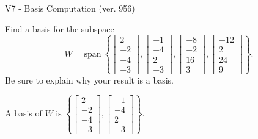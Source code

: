 \begin{exercise}
  \begin{exerciseTitle}V7 - Basis Computation (ver. 956)\end{exerciseTitle}
  \begin{exerciseStatement}
    Find a basis for the subspace 
\[W=\mathrm{span}\ \left\{\left[\begin{array}{r}
2 \\
-2 \\
-4 \\
-3
\end{array}\right] , \left[\begin{array}{r}
-1 \\
-4 \\
2 \\
-3
\end{array}\right] , \left[\begin{array}{r}
-8 \\
-2 \\
16 \\
3
\end{array}\right] , \left[\begin{array}{r}
-12 \\
2 \\
24 \\
9
\end{array}\right]\right\}.\]
 Be sure to explain why your result is a basis.


  \end{exerciseStatement}
  \begin{exerciseAnswer}
   A basis of \(W\) is  \(\left\{\left[\begin{array}{r}
2 \\
-2 \\
-4 \\
-3
\end{array}\right] , \left[\begin{array}{r}
-1 \\
-4 \\
2 \\
-3
\end{array}\right]\right\}\).
  


  \end{exerciseAnswer}
\end{exercise}